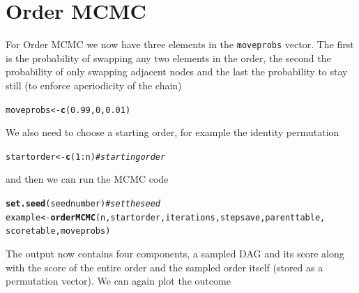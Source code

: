 \documentclass[a4paper]{article}\usepackage[]{graphicx}\usepackage[]{color}
\makeatletter
\newcommand{\hlnum}[1]{\textcolor[rgb]{0.686,0.059,0.569}{#1}}%
\newcommand{\hlcom}[1]{\textcolor[rgb]{0.678,0.584,0.686}{\textit{#1}}}%
\newcommand{\hlopt}[1]{\textcolor[rgb]{0,0,0}{#1}}%
\newcommand{\hlstd}[1]{\textcolor[rgb]{0.345,0.345,0.345}{#1}}%
\newcommand{\hlkwb}[1]{\textcolor[rgb]{0.69,0.353,0.396}{#1}}%
\newcommand{\hlkwd}[1]{\textcolor[rgb]{0.737,0.353,0.396}{\textbf{#1}}}%
\newenvironment{kframe}{%
 \def\at@end@of@kframe{}%
 \ifinner\ifhmode%
  \def\at@end@of@kframe{\end{minipage}}%
  \begin{minipage}{\columnwidth}%
 \fi\fi%
 \def\FrameCommand##1{\hskip\@totalleftmargin \hskip-\fboxsep
 \colorbox{shadecolor}{##1}\hskip-\fboxsep
     \hskip-\linewidth \hskip-\@totalleftmargin \hskip\columnwidth}%
 \MakeFramed {\advance\hsize-\width
   \@totalleftmargin\z@ \linewidth\hsize
   \@setminipage}}%
 {\par\unskip\endMakeFramed%
 \at@end@of@kframe}
\newenvironment{knitrout}{}{} %
\newcommand{\nn}{\noindent}
\makeatother
\begin{document}
\section{Order MCMC}

\nn For Order MCMC we now have three elements in the \texttt{moveprobs} vector.  The first is the probability of swapping any two elements in the order, the second the probability of only swapping adjacent nodes and the last the probability to stay still (to enforce aperiodicity of the chain)

\begin{knitrout}
\color{fgcolor}\begin{kframe}
\begin{alltt}
\hlstd{moveprobs} \hlkwb{<-} \hlkwd{c}\hlstd{(}\hlnum{0.99}\hlstd{,} \hlnum{0}\hlstd{,} \hlnum{0.01}\hlstd{)}
\end{alltt}
\end{kframe}
\end{knitrout}

\nn We also need to choose a starting order, for example the identity permutation

\begin{knitrout}
\color{fgcolor}\begin{kframe}
\begin{alltt}
\hlstd{startorder} \hlkwb{<-} \hlkwd{c}\hlstd{(}\hlnum{1}\hlopt{:}\hlstd{n)}  \hlcom{# starting order}
\end{alltt}
\end{kframe}
\end{knitrout}

\nn and then we can run the MCMC code

\begin{knitrout}
\color{fgcolor}\begin{kframe}
\begin{alltt}
\hlkwd{set.seed}\hlstd{(seednumber)}  \hlcom{# set the seed}
\hlstd{example} \hlkwb{<-} \hlkwd{orderMCMC}\hlstd{(n, startorder, iterations, stepsave, parenttable,}
    \hlstd{scoretable, moveprobs)}
\end{alltt}
\end{kframe}
\end{knitrout}

\nn The output now contains four components, a sampled DAG and its score along with the score of the entire order and the sampled order itself (stored as a permutation vector).  We can again plot the outcome
\end{document}
